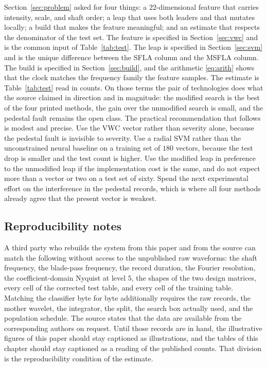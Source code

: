 Section~\ref{sec:problem} asked for four things: a \(22\)-dimensional feature that carries intensity, scale, and shaft order; a leap that uses both leaders and that mutates locally; a build that makes the feature meaningful; and an estimate that respects the denominator of the test set.
The feature is specified in Section~\ref{sec:vwc} and is the common input of Table~\ref{tab:test}.
The leap is specified in Section~\ref{sec:svm} and is the unique difference between the SFLA column and the MSFLA column.
The build is specified in Section~\ref{sec:build}, and the arithmetic \eqref{eq:arith} shows that the clock matches the frequency family the feature samples.
The estimate is Table~\ref{tab:test} read in counts.
On those terms the pair of technologies does what the source claimed in direction and in magnitude: the modified search is the best of the four printed methods, the gain over the unmodified search is small, and the pedestal fault remains the open class.
The practical recommendation that follows is modest and precise.
Use the VWC vector rather than severity alone, because the pedestal fault is invisible to severity.
Use a radial SVM rather than the unconstrained neural baseline on a training set of \(180\) vectors, because the test drop is smaller and the test count is higher.
Use the modified leap in preference to the unmodified leap if the implementation cost is the same, and do not expect more than a vector or two on a test set of sixty.
Spend the next experimental effort on the interference in the pedestal records, which is where all four methods already agree that the present vector is weakest.

\subsection{Reproducibility notes}

A third party who rebuilds the system from this paper and from the source can match the following without access to the unpublished raw waveforms: the shaft frequency, the blade-pass frequency, the record duration, the Fourier resolution, the coefficient-domain Nyquist at level \(5\), the shapes of the two design matrices, every cell of the corrected test table, and every cell of the training table.
Matching the classifier byte for byte additionally requires the raw records, the mother wavelet, the integrator, the split, the search box actually used, and the population schedule.
The source states that the data are available from the corresponding authors on request.
Until those records are in hand, the illustrative figures of this paper should stay captioned as illustrations, and the tables of this chapter should stay captioned as a reading of the published counts.
That division is the reproducibility condition of the estimate.


